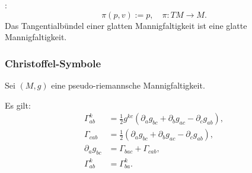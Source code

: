 :
\begin{equation}
\pi(p,v):=p,\quad\pi\colon TM\to M.
\end{equation}
Das Tangentialbündel einer glatten Mannigfaltigkeit ist eine
glatte Mannigfaltigkeit.

\subsubsection{Christoffel-Symbole}
Sei $(M,g)$ eine pseudo-riemannsche Mannigfaltigkeit.

Es gilt:
\begin{align}
\Gamma_{ab}^k &= \frac{1}{2} g^{kc}
(\partial_a g_{bc}+\partial_b g_{ac}-\partial_c g_{ab}),\\
\Gamma_{cab} &= \frac{1}{2}
(\partial_a g_{bc}+\partial_b g_{ac}-\partial_c g_{ab}),\\
\partial_a g_{bc} &= \Gamma_{bac}+\Gamma_{cab},\\
\Gamma_{ab}^k &= \Gamma_{ba}^k.
\end{align}


